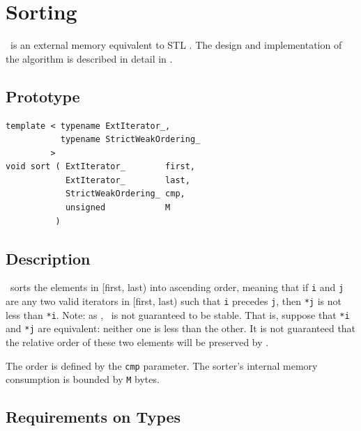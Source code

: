 \documentclass[twoside]{book}
\begin{document}
\section{Sorting}
\label{sortsection}
\xsort\ is an external memory equivalent to STL \stdsort.
The design and implementation of the algorithm is described in detail
in \cite{DemSan03}. 

\subsection*{Prototype}

\begin{lstlisting}
template < typename ExtIterator_, 
           typename StrictWeakOrdering_ 
         >
void sort ( ExtIterator_        first,
            ExtIterator_        last,
            StrictWeakOrdering_ cmp,
            unsigned            M
          )
\end{lstlisting}

\subsection*{Description}

\xsort\ sorts the elements in [first, last) into ascending order,
meaning 
that if \texttt{i} and \texttt{j} are any two valid iterators in
[first, last) such that 
\texttt{i} precedes \texttt{j}, then \texttt{*j} is not less than
\texttt{*i}. Note: as \stdsort, 
\xsort\ is not guaranteed to be stable. That is, suppose that
\texttt{*i} and \texttt{*j} are 
equivalent: neither one is less than the other. It is not guaranteed
that the relative order of these two elements will be preserved by
\xsort. 

The order is defined by the \texttt{cmp} parameter. The sorter's
internal memory consumption is bounded by \texttt{M} bytes.

\subsection*{Requirements on Types}
\end{document}
